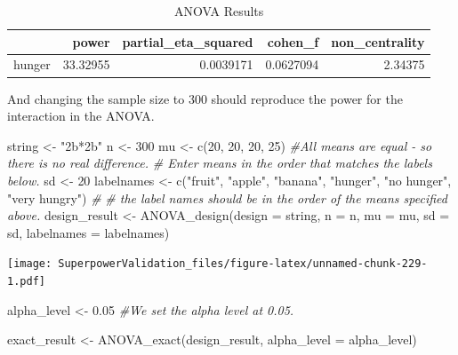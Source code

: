 \documentclass[
]{book}
\newenvironment{Shaded}{\begin{snugshade}}{\end{snugshade}}
\newcommand{\AttributeTok}[1]{\textcolor[rgb]{0.77,0.63,0.00}{#1}}
\newcommand{\CommentTok}[1]{\textcolor[rgb]{0.56,0.35,0.01}{\textit{#1}}}
\newcommand{\DecValTok}[1]{\textcolor[rgb]{0.00,0.00,0.81}{#1}}
\newcommand{\FloatTok}[1]{\textcolor[rgb]{0.00,0.00,0.81}{#1}}
\newcommand{\FunctionTok}[1]{\textcolor[rgb]{0.00,0.00,0.00}{#1}}
\newcommand{\NormalTok}[1]{#1}
\newcommand{\OtherTok}[1]{\textcolor[rgb]{0.56,0.35,0.01}{#1}}
\newcommand{\StringTok}[1]{\textcolor[rgb]{0.31,0.60,0.02}{#1}}
\begin{document}
\begin{table}[!h]

\caption{\label{tab:unnamed-chunk-228}ANOVA Results}
\centering
\begin{tabular}[t]{l|r|r|r|r}
\hline
  & power & partial\_eta\_squared & cohen\_f & non\_centrality\\
\hline
hunger & 33.32955 & 0.0039171 & 0.0627094 & 2.34375\\
\hline
\end{tabular}
\end{table}

And changing the sample size to 300 should reproduce the power for the interaction in the ANOVA.

\begin{Shaded}
\begin{Highlighting}[]
\NormalTok{string }\OtherTok{\textless{}{-}} \StringTok{"2b*2b"}
\NormalTok{n }\OtherTok{\textless{}{-}} \DecValTok{300}
\NormalTok{mu }\OtherTok{\textless{}{-}} \FunctionTok{c}\NormalTok{(}\DecValTok{20}\NormalTok{, }\DecValTok{20}\NormalTok{, }\DecValTok{20}\NormalTok{, }\DecValTok{25}\NormalTok{) }\CommentTok{\#All means are equal {-} so there is no real difference.}
\CommentTok{\# Enter means in the order that matches the labels below.}
\NormalTok{sd }\OtherTok{\textless{}{-}} \DecValTok{20}
\NormalTok{labelnames }\OtherTok{\textless{}{-}} \FunctionTok{c}\NormalTok{(}\StringTok{"fruit"}\NormalTok{, }\StringTok{"apple"}\NormalTok{, }\StringTok{"banana"}\NormalTok{, }
                \StringTok{"hunger"}\NormalTok{, }\StringTok{"no hunger"}\NormalTok{, }\StringTok{"very hungry"}\NormalTok{) }\CommentTok{\#}
\CommentTok{\# the label names should be in the order of the means specified above.}
\NormalTok{design\_result }\OtherTok{\textless{}{-}} \FunctionTok{ANOVA\_design}\NormalTok{(}\AttributeTok{design =}\NormalTok{ string,}
                   \AttributeTok{n =}\NormalTok{ n, }
                   \AttributeTok{mu =}\NormalTok{ mu, }
                   \AttributeTok{sd =}\NormalTok{ sd, }
                   \AttributeTok{labelnames =}\NormalTok{ labelnames)}
\end{Highlighting}
\end{Shaded}

\texttt{[image: SuperpowerValidation\_files/figure-latex/unnamed-chunk-229-1.pdf]}

\begin{Shaded}
\begin{Highlighting}[]
\NormalTok{alpha\_level }\OtherTok{\textless{}{-}} \FloatTok{0.05} \CommentTok{\#We set the alpha level at 0.05. }

\NormalTok{exact\_result }\OtherTok{\textless{}{-}} \FunctionTok{ANOVA\_exact}\NormalTok{(design\_result, }\AttributeTok{alpha\_level =}\NormalTok{ alpha\_level)}
\end{Highlighting}
\end{Shaded}
\end{document}
